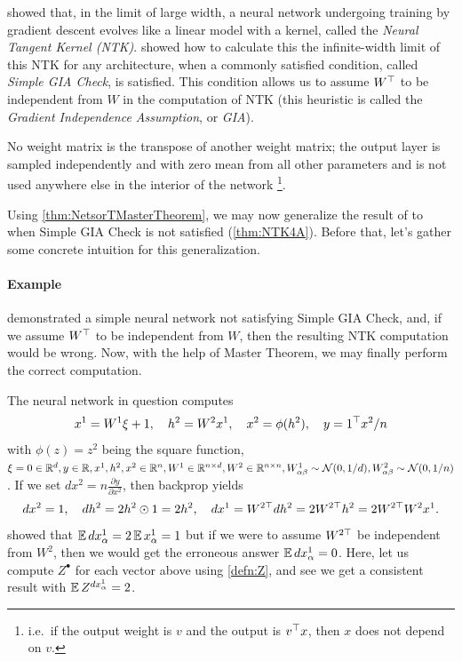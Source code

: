 \documentclass[main.tex]{subfiles}
\begin{document}
\newcommand{\NTK}{\Theta}

\citet{jacot_neural_2018} showed that, in the limit of large width, a neural network undergoing training by gradient descent evolves like a linear model with a kernel, called the \emph{Neural Tangent Kernel (NTK)}.
\citet{yangTP2} showed how to calculate this the infinite-width limit of this NTK for any architecture, when a commonly satisfied condition, called \emph{Simple GIA Check}, is satisfied.
This condition allows us to assume $W^{\top}$ to be independent from $W$ in the computation of NTK (this heuristic is called the \emph{Gradient Independence Assumption}, or \emph{GIA}).
\begin{cond}\label{assm:simpleGIACheck}
    \label{text:simpleGIACheck}
    No weight matrix is the transpose of another weight matrix;
    the output layer is sampled independently and with zero mean from all other parameters and is not used anywhere else in the interior of the network%
    \footnote{i.e.\ if the output weight is $v$ and the output is $v^\top x$, then $x$ does not depend on $v$.}.
\end{cond}
Using \cref{thm:NetsorTMasterTheorem}, we may now generalize the result of \citet{yangTP2} to when Simple GIA Check is not satisfied (\cref{thm:NTK4A}). 
Before that, let's gather some concrete intuition for this generalization.

\paragraph{Example}
\citet{yangTP2} demonstrated a simple neural network not satisfying Simple GIA Check, and, if we assume $W^{\top}$ to be independent from $W$, then the resulting NTK computation would be wrong. Now, with the help of \netsort{} Master Theorem, we may finally perform the correct computation.

The neural network in question computes
\begin{equation}
x^{1}=W^{1}\xi+1,\quad h^{2}=W^{2}x^{1},\quad x^{2}=\phi(h^{2}),\quad y=1^{\trsp}x^{2}/n
\label{eqn:forwardGIABreak}
\end{equation}
with $\phi(z)=z^{2}$ being the square function, $\xi=0\in\mathbb{R}^{d},y\in\mathbb{R},x^{1},h^{2},x^{2}\in\mathbb{R}^{n},W^{1}\in\mathbb{R}^{n\times d},W^{2}\in\mathbb{R}^{n\times n},W_{\alpha\beta}^{1}\sim\mathcal{N}(0,1/d),W_{\alpha\beta}^{2}\sim\mathcal{N}(0,1/n)$. If we set $dx^{2}=n\frac{\partial y}{\partial x^{2}}$, then backprop yields 
\begin{equation}
dx^{2}=1,\quad dh^{2}=2h^{2}\odot1=2h^{2},\quad dx^{1}=W^{2\trsp}dh^{2}=2W^{2\trsp}h^{2}=2W^{2\trsp}W^{2}x^{1}.
\label{eqn:backwardGIABreak}
\end{equation}
\citet{yangTP2} showed that $\operatorname*{\mathbb{E}} dx_{\alpha}^{1}=2\operatorname*{\mathbb{E}} x_{\alpha}^{1}=1$ but if we were to assume $W^{2\top}$ be independent from $W^{2}$, then we would get the erroneous answer $\operatorname*{\mathbb{E}} dx_{\alpha}^{1}=0$. Here, let us compute $Z^\bullet$ for each vector above using \cref{defn:Z}, and see we get a consistent result with $\operatorname*{\mathbb{E}} Z^{dx_{\alpha}^{1}}=2$.
\end{document}
